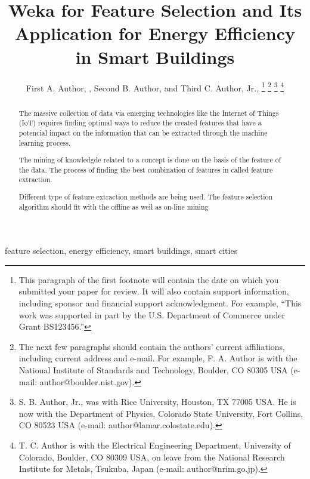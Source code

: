 \documentclass[journal,twoside,web]{ieeecolor}
\begin{document}
\title{Weka for Feature Selection and Its Application for Energy Efficiency in Smart Buildings}
\author{First A. Author, , Second B. Author, and Third C. Author, Jr., 
\thanks{This paragraph of the first footnote will contain the date on 
which you submitted your paper for review. It will also contain support 
information, including sponsor and financial support acknowledgment. For 
example, ``This work was supported in part by the U.S. Department of 
Commerce under Grant BS123456.'' }
\thanks{The next few paragraphs should contain 
the authors' current affiliations, including current address and e-mail. For 
example, F. A. Author is with the National Institute of Standards and 
Technology, Boulder, CO 80305 USA (e-mail: author@boulder.nist.gov). }
\thanks{S. B. Author, Jr., was with Rice University, Houston, TX 77005 USA. He is 
now with the Department of Physics, Colorado State University, Fort Collins, 
CO 80523 USA (e-mail: author@lamar.colostate.edu).}
\thanks{T. C. Author is with 
the Electrical Engineering Department, University of Colorado, Boulder, CO 
80309 USA, on leave from the National Research Institute for Metals, 
Tsukuba, Japan (e-mail: author@nrim.go.jp).}}

\maketitle

\begin{abstract}


The massive collection of data via emerging technologies like the Internet of Things (IoT) requires finding optimal ways to
reduce the created features that have a potencial impact on the information that can be extracted through the machine learning process.

The mining of knowledgde related to a concept is done on the basis of the feature of the data. The process of finding the best combination of features in called feature extraction.


Different type of feature extraction methods are being used. The
feature selection algorithm should fit with the offline as weil as
on-line mining





\end{abstract}

\begin{IEEEkeywords}
feature selection, energy efficiency, smart buildings, smart cities
\end{IEEEkeywords}
\end{document}
